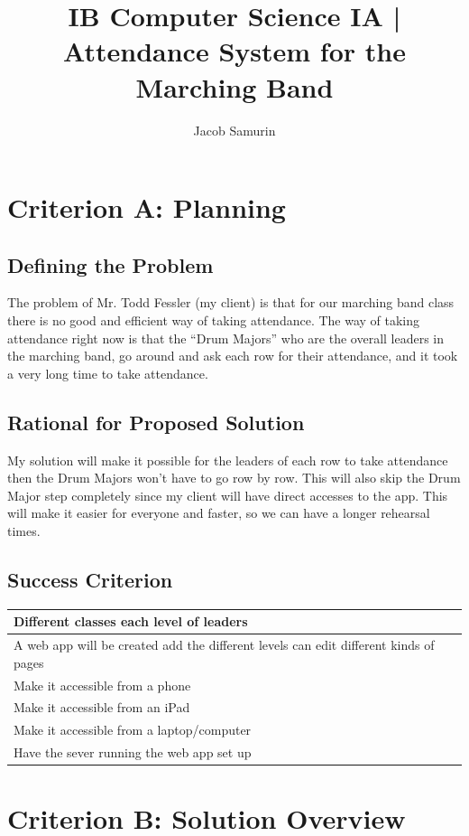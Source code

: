 \documentclass{article}
\title{IB Computer Science IA | Attendance System for the Marching Band}
\author{Jacob Samurin}
\begin{document}
\maketitle
\newpage
\tableofcontents
\newpage
\section{Criterion A: Planning}
\subsection{Defining the Problem}
The problem of Mr. Todd Fessler (my client) is that for our marching band class there is no good and efficient way of taking attendance. The way of taking attendance right now is that the “Drum Majors” who are the overall leaders in the marching band, go around and ask each row for their attendance, and it took a very long time to take attendance.
\subsection{Rational for Proposed Solution}
My solution will make it possible for the leaders of each row to take attendance then the Drum Majors won’t have to go row by row. This will also skip the Drum Major step completely since my client will have direct accesses to the app. This will make it easier for everyone and faster, so we can have a longer rehearsal times.
\subsection{Success Criterion}
\begin{center}
	\begin{tabular}{|l|}
		\hline
		Different classes each level of leaders\\
		\hline
		A web app will be created add the different levels can edit different kinds of pages\\
		\hline
		Make it accessible from a phone\\
		\hline
		Make it accessible from an iPad\\
		\hline
		Make it accessible from a laptop/computer\\
		\hline
		Have the sever running the web app set up\\
		\hline
	\end{tabular}
\end{center}
\newpage
\section{Criterion B: Solution Overview}
\end{document}
